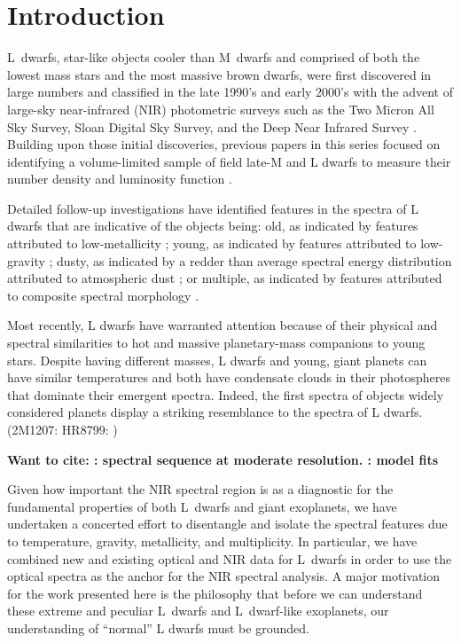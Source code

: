 \documentclass[12pt,preprint]{aastex}
\begin{document}

\section{Introduction}
L~dwarfs, star-like objects cooler than M~dwarfs and comprised of both the lowest mass stars and the most massive brown dwarfs, were first discovered in large numbers and classified in the late 1990's and early 2000's with the advent of large-sky near-infrared (NIR) photometric surveys such as the Two Micron All Sky Survey, Sloan Digital Sky Survey, and the Deep Near Infrared Survey \citep{K99,Martin99,K00,Hawley02,Kendall04,Knapp04}. 
Building upon those initial discoveries, previous papers in this series focused on identifying a volume-limited sample of field late-M and L dwarfs to measure their number density and luminosity function \citep[Papers V, IX, and X]{Cruz03,Cruz07,Reid08}.

Detailed follow-up investigations have identified features in the spectra of L dwarfs that are indicative of the objects being: old, as indicated by features attributed to low-metallicity \citep{Burgasser08_blue}; young, as indicated by features attributed to low-gravity \citep{Kirkpatrick08,Cruz09_lowg}; dusty, as indicated by a redder than average spectral energy distribution attributed to atmospheric dust \citep{Looper08_dusty,Geissler2011,Gizis12_0047}; or multiple, as indicated by features attributed to composite spectral morphology \citep{Cruz04,Burgasser07_0805,Geissler2011,Burgasser08_0320}.

Most recently, L dwarfs have warranted attention because of their physical and spectral similarities to hot and massive planetary-mass companions to young stars. 
Despite having different masses, L dwarfs and young, giant planets can have similar temperatures and both have condensate clouds in their photospheres that dominate their emergent spectra.
Indeed, the first spectra of objects widely considered planets display a striking resemblance to the spectra of L dwarfs. (2M1207: \citet{Patience10}
HR8799: \citet{Barman:2011wp,Bowler10_HR8799,Konopacky:2013jv,Oppenheimer:2013gy})

\textbf{Want to cite: \citet{Cushing05}: spectral sequence at moderate resolution. \citet{Cushing08, Witte11}: model fits
}

Given how important the NIR spectral region is as a diagnostic for the fundamental properties of both L~dwarfs and giant exoplanets, we have undertaken a concerted effort to disentangle and isolate the spectral features due to temperature, gravity, metallicity, and multiplicity. In particular, we have combined new and existing optical and NIR data for L~dwarfs in order to use the optical spectra as the anchor for the NIR spectral analysis. 
A major motivation for the work presented here is the philosophy that before we can understand these extreme and peculiar L~dwarfs and L~dwarf-like exoplanets, our understanding of ``normal'' L dwarfs must be grounded. 
\end{document}
